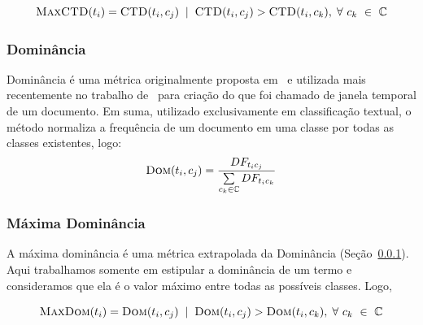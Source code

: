 \begin{equation}\label{eqn::maxdom}
 \textsc{MaxCTD}(t_i) = \textsc{CTD}(t_i,c_j) \; \; | \;\; \textsc{CTD}(t_i, c_j) > \textsc{CTD}(t_i, c_k), \; \forall\ c_k\ \in\ \mathbb{C}
\end{equation}

\subsubsection{Dominância}
\label{subsubsection::dom}

Dominância é uma métrica originalmente proposta em~\cite{Zaiane02} e utilizada mais recentemente no trabalho de~\cite{Rocha08} para criação do que foi chamado de janela temporal de um documento. Em suma, utilizado exclusivamente em classificação textual, o método normaliza a frequência de um documento em uma classe por todas as classes existentes, logo:
\begin{equation}\label{eqn::dom}
 \textsc{Dom}(t_i, c_j) = \frac{ DF_{t_ic_j} } { \sum\limits_{c_k \in \mathbb{C}} DF_{t_ic_k} } 
\end{equation}


\subsubsection{Máxima Dominância}
\label{subsubsection::maxdom}
A máxima dominância é uma métrica extrapolada da Dominância (Seção~\ref{subsubsection::dom}). Aqui trabalhamos somente em estipular a dominância de um termo e consideramos que ela é o valor máximo entre todas as possíveis classes. Logo,

\begin{equation}\label{eqn::maxdom}
 \textsc{MaxDom}(t_i) = \textsc{Dom}(t_i,c_j) \; \; | \;\; \textsc{Dom}(t_i, c_j) > \textsc{Dom}(t_i, c_k), \; \forall\ c_k\ \in\ \mathbb{C}
\end{equation}

